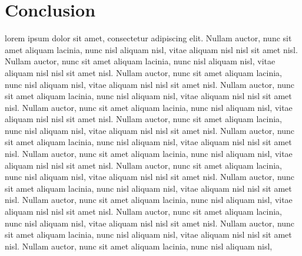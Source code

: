 \section{Conclusion}
	lorem ipsum dolor sit amet, consectetur adipiscing elit. Nullam auctor, nunc sit amet aliquam lacinia, nunc nisl aliquam nisl, vitae aliquam nisl nisl sit amet nisl. Nullam auctor, nunc sit amet aliquam lacinia, nunc nisl aliquam nisl, vitae aliquam nisl nisl sit amet nisl. Nullam auctor, nunc sit amet aliquam lacinia, nunc nisl aliquam nisl, vitae aliquam nisl nisl sit amet nisl. Nullam auctor, nunc sit amet aliquam lacinia, nunc nisl aliquam nisl, vitae aliquam nisl nisl sit amet nisl. Nullam auctor, nunc sit amet aliquam lacinia, nunc nisl aliquam nisl, vitae aliquam nisl nisl sit amet nisl. Nullam auctor, nunc sit amet aliquam lacinia, nunc nisl aliquam nisl, vitae aliquam nisl nisl sit amet nisl. Nullam auctor, nunc sit amet aliquam lacinia, nunc nisl aliquam nisl, vitae aliquam nisl nisl sit amet nisl. Nullam auctor, nunc sit amet aliquam lacinia, nunc nisl aliquam nisl, vitae aliquam nisl nisl sit amet nisl. Nullam auctor, nunc sit amet aliquam lacinia, nunc nisl aliquam nisl, vitae aliquam nisl nisl sit amet nisl. Nullam auctor, nunc sit amet aliquam lacinia, nunc nisl aliquam nisl, vitae aliquam nisl nisl sit amet nisl. Nullam auctor, nunc sit amet aliquam lacinia, nunc nisl aliquam nisl, vitae aliquam nisl nisl sit amet nisl. Nullam auctor, nunc sit amet aliquam lacinia, nunc nisl aliquam nisl, vitae aliquam nisl nisl sit amet nisl. Nullam auctor, nunc sit amet aliquam lacinia, nunc nisl aliquam nisl, vitae aliquam nisl nisl sit amet nisl. Nullam auctor, nunc sit amet aliquam lacinia, nunc nisl aliquam nisl,